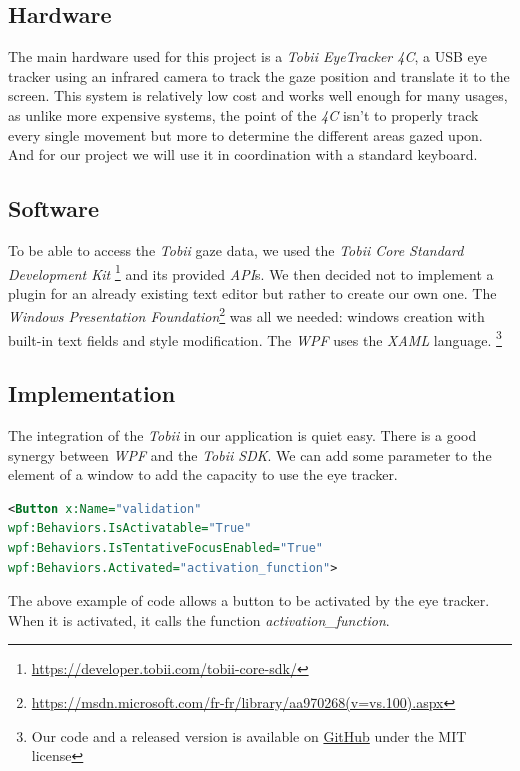 \documentclass[12pt, a4paper]{article}
\begin{document}
\subsection{Hardware} \label{hardware}
The main hardware used for this project is a \textit{Tobii EyeTracker 4C}, a USB eye tracker using an infrared camera to track the gaze position and translate it to the screen. This system is relatively low cost and works well enough for many usages, as unlike more expensive systems, the point of the \textit{4C} isn't to properly track every single movement but more to determine the different areas gazed upon. 
And for our project we will use it in coordination with a standard keyboard.

\subsection{Software}
To be able to access the \textit{Tobii} gaze data, we used the \textit{Tobii Core Standard Development Kit} \footnote{\url{https://developer.tobii.com/tobii-core-sdk/}} 
and its provided \textit{API}s. 
We then decided not to implement a plugin for an already existing text editor but rather to create our own one. The \textit{Windows Presentation Foundation}\footnote{\url{https://msdn.microsoft.com/fr-fr/library/aa970268(v=vs.100).aspx}} was all we needed: windows creation with built-in text fields and style modification. The \textit{WPF} uses the \textit{XAML} language. \footnote{Our code and a released version is available on \href{https://github.com/marom17/E.A.T./releases/tag/1.0.5}{GitHub} under the MIT license}

\subsection{Implementation}
The integration of the \textit{Tobii} in our application is quiet easy. There is a good synergy between \textit{WPF} and the \textit{Tobii SDK}. We can add some parameter to the element of a window to add the capacity to use the eye tracker.

\begin{lstlisting}[frame=single, language=XML]
<Button x:Name="validation"
wpf:Behaviors.IsActivatable="True"
wpf:Behaviors.IsTentativeFocusEnabled="True"
wpf:Behaviors.Activated="activation_function">
\end{lstlisting}

The above example of code allows a button to be activated by the eye tracker. When it is activated, it calls the function \textit{activation\_function}.
\end{document}
